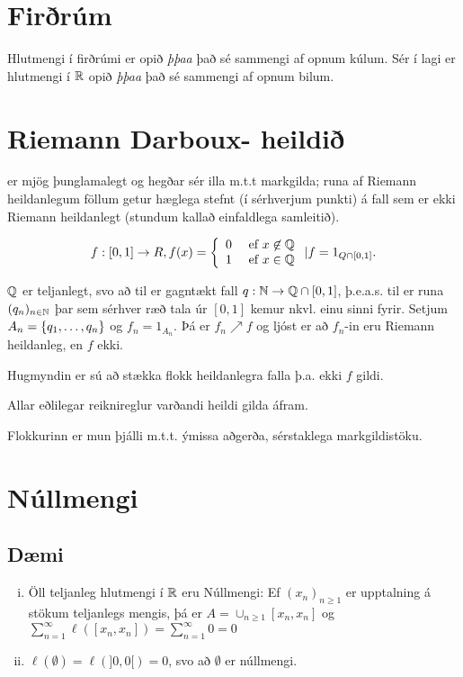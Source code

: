 \documentclass[12pt]{book} \usepackage[utf8]{inputenc}
\begin{document}
\section{Firðrúm}
Hlutmengi í firðrúmi er opið \emph{þþaa} það sé sammengi af opnum
kúlum. Sér í lagi er hlutmengi í $\mathbb{R}$ opið \emph{þþaa} það sé sammengi
af opnum bilum.

\section{Riemann Darboux- heildið}
er mjög þunglamalegt og hegðar sér illa m.t.t markgilda; runa af
Riemann heildanlegum föllum getur hæglega stefnt (í sérhverjum punkti)
á fall sem er ekki Riemann heildanlegt (stundum kallað einfaldlega
samleitið).

\begin{daemi}
  \[f: [0,1] \to R, f(x) = \left\{ \begin{array}{l l} 0 & \text{ ef } x \not\in \mathbb{Q} \\ 1 & \text{ ef } x
  \in \mathbb{Q} \end{array} \right. | f = 1_{Q \cap [0,1]}. \]

  $\mathbb{Q}$ er teljanlegt, svo að til er gagntækt fall
  $q: \mathbb{N} \to \mathbb{Q} \cap [0,1]$, þ.e.a.s. til er runa $(q_n)_{n \in \mathbb{N}}$
  þar sem sérhver ræð tala úr $[0,1]$ kemur nkvl. einu sinni
  fyrir. Setjum $A_n = \{q_1, \dotsc, q_n\}$ og $f_n = 1_{A_n}$. Þá
  er $f_n \nearrow f$ og ljóst er að $f_n$-in eru Riemann heildanleg,
  en $f$ ekki.

  Hugmyndin er sú að stækka flokk heildanlegra falla þ.a. ekki $f$
  gildi.

  Allar eðlilegar reiknireglur varðandi heildi gilda áfram.

  Flokkurinn er mun þjálli m.t.t. ýmissa aðgerða, sérstaklega
  markgildistöku.
\end{daemi}

\section{Núllmengi}
\subsection{Dæmi}
\begin{enumerate}[i)]
\item Öll teljanleg hlutmengi í $\mathbb{R}$ eru Núllmengi: Ef
  $(x_n)_{n \geq 1}$ er upptalning á stökum teljanlegs mengis, þá er
  $A = \cup_{n \geq 1} [x_n, x_n]$ og
  $\sum_{n = 1}^{\infty} \ell([x_n,x_n]) = \sum_{n=1}^{\infty} 0 = 0$
\item $\ell(\emptyset) = \ell(]0,0[) = 0$, svo að $\emptyset$ er
  núllmengi.
\end{enumerate}
\end{document}
